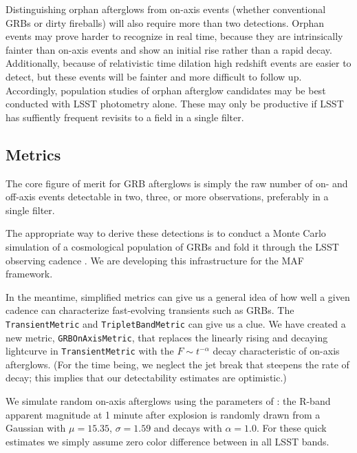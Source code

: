Distinguishing orphan afterglows from on-axis events (whether conventional GRBs or dirty fireballs) will also require more than two detections.  Orphan events may prove harder to recognize in real time, because they are intrinsically fainter than on-axis events and show an initial rise rather than a rapid decay.  
Additionally, because of relativistic time dilation high redshift events are easier to detect, but these events will be fainter and more difficult to follow up.
Accordingly, population studies of orphan afterglow candidates may be best conducted with LSST photometry alone.  These may only be productive if LSST has suffiently frequent revisits to a field in a single filter.


\subsection{Metrics}
\label{sec:\secname:metrics}

The core figure of merit for GRB afterglows is simply the raw number of on- and off-axis events detectable in two, three, or more observations, preferably in a single filter.

The appropriate way to derive these detections is to conduct a Monte Carlo simulation of a cosmological population of GRBs and fold it through the LSST observing cadence \citep[cf.][]{2011PASP..123.1034J}.  We are developing this infrastructure for the MAF framework.  

In the meantime, simplified metrics can give us a general idea of how well a given cadence can characterize fast-evolving transients such as GRBs.
The \texttt{TransientMetric} and \texttt{TripletBandMetric} 
can give us a clue.  We have created a new metric, \texttt{GRBOnAxisMetric}, that replaces the linearly rising and decaying lightcurve in 
\texttt{TransientMetric} with the $F \sim t^{-\alpha}$ decay characteristic of on-axis afterglows.  (For the time being, we neglect the jet break that steepens the rate of decay; this implies that our detectability estimates are optimistic.)

We simulate random on-axis afterglows using the parameters of \citet{2011PASP..123.1034J}: the R-band apparent magnitude at 1 minute after explosion is randomly drawn from a Gaussian with $\mu=15.35$, $\sigma=1.59$ and decays with $\alpha=1.0$.  For these quick estimates we simply assume zero color difference between in all LSST bands.

